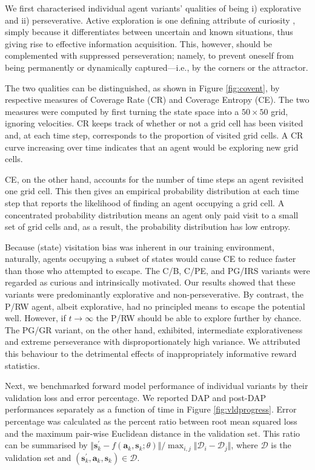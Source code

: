 \documentclass[utf8]{frontiersSCNS}
\newcommand{\bs}{\boldsymbol}
\begin{document}
We first characterised individual agent variants' qualities of being i) explorative and ii) perseverative. Active exploration is one defining attribute of curiosity \citep{2013gottlieb}, simply because it differentiates between uncertain and known situations, thus giving rise to effective information acquisition. This, however, should be complemented with suppressed perseveration; namely, to prevent oneself from being permanently or dynamically captured---i.e., by the corners or the attractor. 

The two qualities can be distinguished, as shown in Figure \ref{fig:covent}, by respective measures of Coverage Rate (CR) and Coverage Entropy (CE). The two measures were computed by first turning the state space into a $50\times 50$ grid, ignoring velocities. CR keeps track of whether or not a grid cell has been visited and, at each time step, corresponds to the proportion of visited grid cells. A CR curve increasing over time indicates that an agent would be exploring new grid cells. 

CE, on the other hand, accounts for the number of time steps an agent revisited one grid cell. This then gives an empirical probability distribution at each time step that reports the likelihood of finding an agent occupying a grid cell. A concentrated probability distribution means an agent only paid visit to a small set of grid cells and, as a result, the probability distribution has low entropy.

Because (state) visitation bias was inherent in our training environment, naturally, agents occupying a subset of states would cause CE to reduce faster than those who attempted to escape. The C/B, C/PE, and PG/IRS variants were regarded as curious and intrinsically motivated. Our results showed that these variants were predominantly explorative and non-perseverative. By contrast, the P/RW agent, albeit explorative, had no principled means to escape the potential well. However, if $t\to\infty$ the P/RW should be able to explore further by chance. The PG/GR variant, on the other hand, exhibited, intermediate explorativeness and extreme perseverance with disproportionately high variance. We attributed this behaviour to the detrimental effects of inappropriately informative reward statistics. 

Next, we benchmarked forward model performance of individual variants by their validation loss and error percentage. We reported DAP and post-DAP performances separately as a function of time in Figure \ref{fig:vldprogress}. Error percentage was calculated as the percent ratio between root mean squared loss and the maximum pair-wise Euclidean distance in the validation set. This ratio can be summarised by $\Vert \bs s^\prime_k - f(\bs a_k, \bs s_k; \theta) \Vert / \max_{i, j}\Vert \mathcal D_i - \mathcal D_j \Vert$, where $\mathcal D$ is the validation set and $(\bs s^\prime_k, \bs a_k, \bs s_k) \in \mathcal D$.
\end{document}
